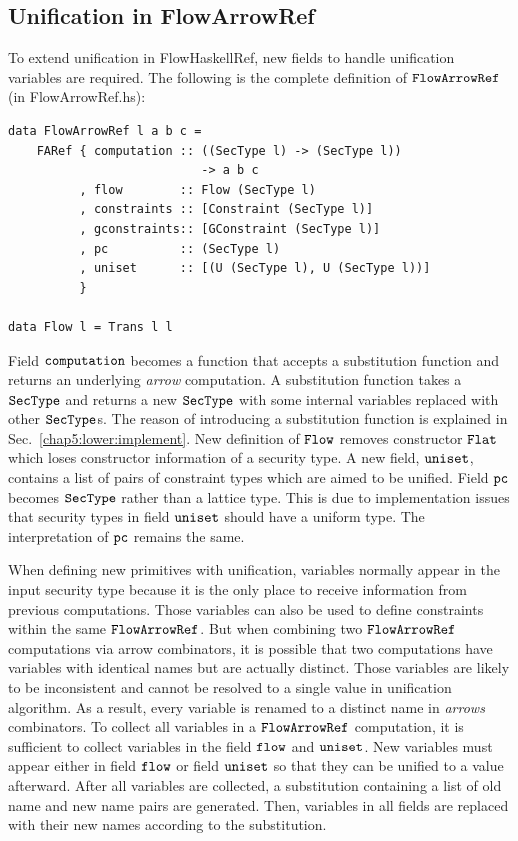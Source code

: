 \documentclass{report}
\newcommand{\co}[1]{$\cod{#1}$}
\begin{document}
\subsection{Unification in FlowArrowRef}
\label{chap4:unification:flowarrowref}
To extend unification in FlowHaskellRef, new fields to handle unification variables are required.
The following is the complete definition of \co{FlowArrowRef}(in FlowArrowRef.hs):
\begin{Verbatim}[fontsize=\small]
data FlowArrowRef l a b c = 
    FARef { computation :: ((SecType l) -> (SecType l)) 
                           -> a b c
          , flow        :: Flow (SecType l)
          , constraints :: [Constraint (SecType l)]
          , gconstraints:: [GConstraint (SecType l)]
          , pc          :: (SecType l)
          , uniset      :: [(U (SecType l), U (SecType l))]
          }

data Flow l = Trans l l 
\end{Verbatim}
Field \co{computation} becomes a function that accepts a substitution function and returns an underlying
{\em arrow} computation. A substitution function takes a \co{SecType} and returns a new \co{SecType} with some 
internal variables replaced with other \co{SecType}s.
The reason of introducing a substitution function is explained in Sec.~\ref{chap5:lower:implement}.
New definition of \co{Flow} removes constructor \co{Flat} which loses constructor information of a
security type. A new field, \co{uniset}, contains a list of pairs of constraint types which are aimed 
to be unified.
Field \co{pc} becomes \co{SecType} rather than a lattice type. This is due to implementation issues that 
security types in field \co{uniset} should have a uniform type.
The interpretation of \co{pc} remains the same.

When defining new primitives with unification, variables normally appear in the input security type 
because it is the only place to receive information from previous computations.
Those variables can also be used to define constraints within the 
same \co{FlowArrowRef}. But when combining two \co{FlowArrowRef} computations via arrow combinators,
it is possible that two computations have variables with identical names but are actually distinct.
Those variables are likely to be inconsistent and cannot be resolved to a single value in unification 
algorithm. As a result, every variable is renamed to a distinct name in {\em arrows} combinators. 
To collect all variables in a \co{FlowArrowRef} computation, it is sufficient to collect variables in the field
\co{flow} and \co{uniset}. New variables must appear either in field \co{flow} or field
\co{uniset} so that they can be unified to a value afterward. 
After all variables are collected, a substitution containing a list of old name and new name pairs are
generated.
Then, variables in all fields are replaced with their new names according to the substitution.
\end{document}
